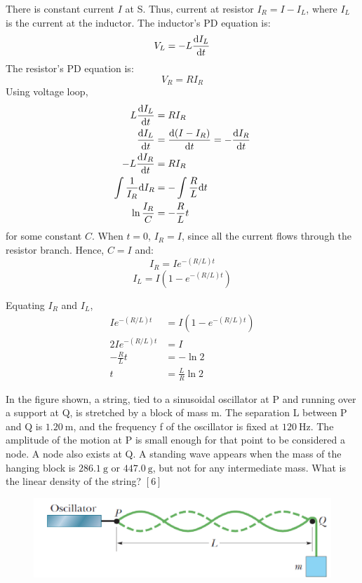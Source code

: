 \begin{solution}
    \begin{subsolution}
        There is constant current $I$ at S. Thus, current at resistor $I_R = I - I_L$, where $I_L$ is the current at the inductor.
        The inductor's PD equation is: 
        \[V_L = -L \frac{\mathrm{d} I_L}{\mathrm{d} t}\]
        The resistor's PD equation is:
        \[V_R = R I_R\]
        Using voltage loop, 
        \begin{align}
            L \frac{\mathrm{d} I_L}{\mathrm{d} t} &= R I_R \\
            \frac{\mathrm{d} I_L}{\mathrm{d} t} &= \frac{\mathrm{d}(I - I_R)}{\mathrm{d} t} = -\frac{\mathrm{d} I_R}{\mathrm{d} t} \\
            -L \frac{\mathrm{d} I_R}{\mathrm{d} t} &= R I_R \\
            \int \frac{1}{I_R} \mathrm{d} I_R &= -\int \frac{R}{L} \mathrm{d} t \\
            \ln{\frac{I_R}{C}} &= -\frac{R}{L}t
        \end{align}
        for some constant $C$. When $t=0$, $I_R = I$, since all the current flows through the resistor branch. Hence, $C=I$ and:
        \[I_R=I{e}^{-(R/L)t}\]
        \[I_L=\boxed{I\left(1-{e}^{-(R/L)t}\right)}\]
    \end{subsolution}
    \begin{subsolution}
        Equating $I_R$ and $I_L$,
        \begin{align*}
            I{e}^{-(R/L)t}&=I\left(1-{e}^{-(R/L)t}\right)\\
            2I{e}^{-(R/L)t}&=I\\
            -\frac{R}{L}t&=-\ln 2\\
            t&=\boxed{\frac{L}{R}\ln 2}
        \end{align*}
    \end{subsolution}
\end{solution}

\newpage

\begin{problem}
    In the figure shown, a string, tied to a sinusoidal oscillator at P and running over a support at Q, is stretched by a block of mass m. The separation L between P and Q is $\qty{1.20}{\m}$, and the frequency f of the oscillator is fixed at $\qty{120}{\Hz}$. The amplitude of the motion at P is small enough for that point to be considered a node. A node also exists at Q. A standing wave appears when the mass of the hanging block is $\qty{286.1}{\g}$ or $\qty{447.0}{\g}$, but not for any intermediate mass. What is the linear density of the string? \hfill $[6]$
    \begin{figure}[H]
        \centering
        \includegraphics[width=0.8\linewidth]{spho_book_TYS_images/2021SPhO_5.png}
    \end{figure}
\end{problem}


